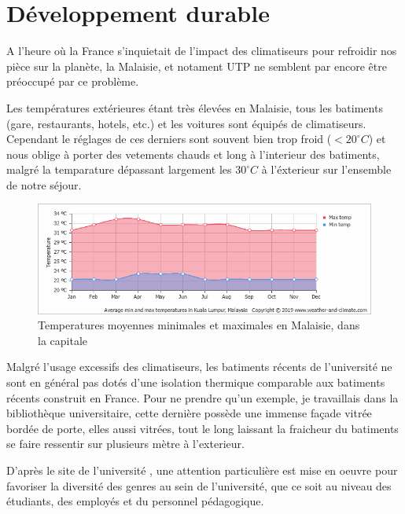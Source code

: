 \chapter{Développement durable}

A l'heure où la France s'inquietait de l'impact des climatiseurs pour refroidir nos pièce sur la planète, la Malaisie, et notament UTP ne semblent par encore être préoccupé par ce problème.

Les températures extérieures étant très élevées en Malaisie, tous les batiments (gare, restaurants, hotels, etc.) et les voitures sont équipés de climatiseurs. Cependant le réglages de ces derniers sont souvent bien trop froid ($< 20^{\circ}C$) et nous oblige à porter des vetements chauds et long à l'interieur des batiments, malgré la temparature dépassant largement les $30^{\circ}C$ à l'éxterieur sur l'ensemble de  notre séjour.

\begin{figure}[h]
  \includegraphics[width=1\linewidth]{content/imgs/temp.png}
  \caption{Temperatures moyennes minimales et maximales en Malaisie, dans la capitale}
  \label{fig:climate}
\end{figure}

Malgré l'usage excessifs des climatiseurs, les batiments récents de l'université ne sont en général pas dotés d'une isolation thermique comparable aux batiments récents construit en France. Pour ne prendre qu'un exemple, je travaillais dans la bibliothèque universitaire, cette dernière possède une immense façade vitrée bordée de porte, elles aussi vitrées, tout le long laissant la fraicheur du batiments se faire ressentir sur plusieurs mètre à l'exterieur.

D'après le site de l'université \cite{utp_gender}, une attention particulière est mise en oeuvre pour favoriser la diversité des genres au sein de l'université, que ce soit au niveau des étudiants, des employés et du personnel pédagogique.
